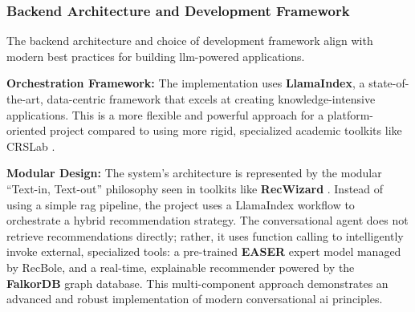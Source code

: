 \subsubsection{Backend Architecture and Development Framework}

The backend architecture and choice of development framework align with modern best practices for building \ac{llm}-powered applications.

\begin{compactitem}[\textbullet]
    \item \textbf{Orchestration Framework:} The implementation uses \textbf{LlamaIndex}, a state-of-the-art, data-centric framework that excels at creating knowledge-intensive applications. This is a more flexible and powerful approach for a platform-oriented project compared to using more rigid, specialized academic toolkits like CRSLab \cite{CRSLAB}.

    \item \textbf{Modular Design:} The system's architecture is represented by the modular ``Text-in, Text-out'' philosophy seen in toolkits like \textbf{RecWizard} \cite{RECWIZARD}. Instead of using a simple \ac{rag} pipeline, the project uses a LlamaIndex workflow to orchestrate a hybrid recommendation strategy. The conversational agent does not retrieve recommendations directly; rather, it uses function calling to intelligently invoke external, specialized tools: a pre-trained \textbf{EASER} expert model managed by RecBole, and a real-time, explainable recommender powered by the \textbf{FalkorDB} graph database. This multi-component approach demonstrates an advanced and robust implementation of modern conversational \acs{ai} principles.
\end{compactitem}